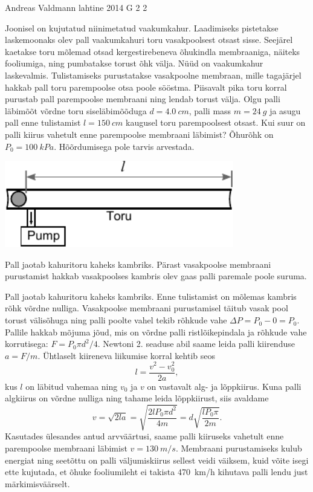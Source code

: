 {Andreas Valdmann} %
{lahtine} %
{2014} %
{G 2} %
{2} %
{
\ifStatement
Joonisel on kujutatud niinimetatud vaakumkahur. Laadimiseks pistetakse laskemoonaks olev pall vaakumkahuri toru vasakpoolsest otsast sisse. Seejärel kaetakse toru mõlemad otsad kergestirebeneva õhukindla membraaniga, näiteks fooliumiga, ning pumbatakse torust õhk välja. Nüüd on vaakumkahur laskevalmis. Tulistamiseks purustatakse vasakpoolne membraan, mille tagajärjel hakkab pall toru parempoolse otsa poole sööstma. Piisavalt pika toru korral purustab pall parempoolse membraani ning lendab torust välja. Olgu palli läbimõõt võrdne toru siseläbimõõduga $d=\SI{4,0}{cm}$, palli mass $m=\SI{24}{g}$ ja asugu pall enne tulistamist $l=\SI{150}{cm}$ kaugusel toru parempoolsest otsast. Kui suur on palli kiirus vahetult enne parempoolse membraani läbimist? Õhurõhk on $P_0=\SI{100}{kPa}$. Hõõrdumisega pole tarvis arvestada.
\begin{center}
  \includegraphics[width=0.75\textwidth]{2014-lahg-02-vaakumkahur.pdf}
\end{center}
\fi


\ifHint
Pall jaotab kahuritoru kaheks kambriks. Pärast vasakpoolse membraani purustamist hakkab vasakpoolses kambris olev gaas palli paremale poole suruma.
\fi


\ifSolution
Pall jaotab kahuritoru kaheks kambriks. Enne tulistamist on mõlemas kambris rõhk võrdne nulliga. Vasakpoolse membraani purustamisel täitub vasak pool torust välisõhuga ning palli poolte vahel tekib rõhkude vahe $\Delta P=P_0-0=P_0$. Pallile hakkab mõjuma jõud, mis on võrdne palli ristlõikepindala ja rõhkude vahe korrutisega: $F=P_0\pi d^2/4$. Newtoni 2. seaduse abil saame leida palli kiirenduse $a=F/m$. Ühtlaselt kiireneva liikumise korral kehtib seos
\[ l=\frac{v^2-v_0^2}{2a}, \]
kus $l$ on läbitud vahemaa ning $v_0$ ja $v$ on vastavalt alg- ja lõppkiirus. Kuna palli algkiirus on võrdne nulliga ning tahame leida lõppkiirust, siis avaldame
\[ v=\sqrt{2la}=\sqrt{\frac{2lP_0\pi d^2}{4m}}=d\sqrt{\frac{lP_0\pi}{2m}}.\]
Kasutades ülesandes antud arvväärtusi, saame palli kiiruseks vahetult enne parempoolse membraani läbimist $v=\SI{130}{m/s}$. Membraani purustamiseks kulub energiat ning seetõttu on palli väljumiskiirus sellest veidi väiksem, kuid võite isegi ette kujutada, et õhuke fooliumileht ei takista \SI{470}{km/h} kihutava palli lendu just märkimisväärselt.
\fi


}
